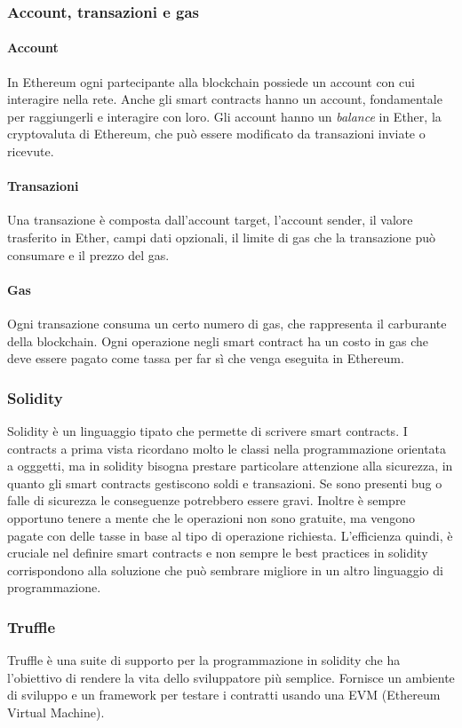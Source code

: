 \subsubsection{Account, transazioni e gas}
\paragraph{Account}
In Ethereum ogni partecipante alla blockchain possiede un account con cui interagire nella rete. Anche gli smart contracts hanno un account, fondamentale per raggiungerli e interagire con loro. Gli account hanno un \textit{balance} in Ether, la cryptovaluta di Ethereum, che può essere modificato da transazioni inviate o ricevute.
\paragraph{Transazioni}
Una transazione è composta dall'account target, l'account sender, il valore trasferito in Ether, campi dati opzionali, il limite di gas che la transazione può consumare e il prezzo del gas.
\paragraph{Gas}
Ogni transazione consuma un certo numero di gas, che rappresenta il carburante della blockchain. Ogni operazione negli smart contract ha un costo in gas che deve essere pagato come tassa per far sì che venga eseguita in Ethereum. 

\subsubsection{Solidity}
Solidity è un linguaggio tipato che permette di scrivere smart contracts. I contracts a prima vista ricordano molto le classi nella programmazione orientata a ogggetti, ma in solidity bisogna prestare particolare attenzione alla sicurezza, in quanto gli smart contracts gestiscono soldi e transazioni. Se sono presenti bug o falle di sicurezza le conseguenze potrebbero essere gravi. Inoltre è sempre opportuno tenere a mente che le operazioni non sono gratuite, ma vengono pagate con delle tasse in base al tipo di operazione richiesta. L'efficienza quindi, è cruciale nel definire smart contracts e non sempre le best practices in solidity corrispondono alla soluzione che può sembrare migliore in un altro linguaggio di programmazione.

\subsubsection{Truffle}
Truffle è una suite di supporto per la programmazione in solidity che ha l'obiettivo di rendere la vita dello sviluppatore più semplice. Fornisce un ambiente di sviluppo e un framework per testare i contratti usando una EVM (Ethereum Virtual Machine). 
